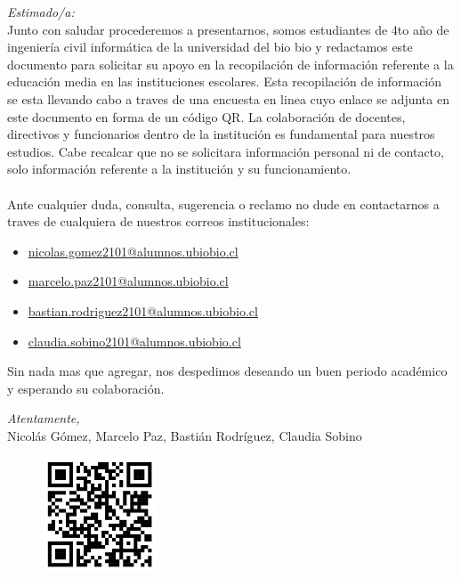 \documentclass{templateNote}
\newcommand{\email}[1]{\href{mailto:#1}{#1}}
\begin{document}


\portada
\margenes 

\noindent\textit{Estimado/a:}\\

Junto con saludar procederemos a presentarnos, somos estudiantes de 4to año de ingeniería civil informática de la universidad del bio bio y redactamos este documento para solicitar su apoyo en la recopilación de información referente a la educación media en las instituciones escolares. Esta recopilación de información se esta llevando  cabo a traves de una encuesta en linea cuyo enlace se adjunta en este documento en forma de un código QR. La colaboración de docentes, directivos y funcionarios dentro de la institución es fundamental para nuestros estudios. Cabe recalcar que no se solicitara información personal ni de contacto, solo información referente a la institución y su funcionamiento.  
\\\\
Ante cualquier duda, consulta, sugerencia o reclamo no dude en contactarnos a traves de cualquiera de nuestros correos institucionales:
\begin{itemize}
    \item \email{nicolas.gomez2101@alumnos.ubiobio.cl}
    \item \email{marcelo.paz2101@alumnos.ubiobio.cl}
    \item \email{bastian.rodriguez2101@alumnos.ubiobio.cl}
    \item \email{claudia.sobino2101@alumnos.ubiobio.cl}
\end{itemize}

\noindent Sin nada mas que agregar, nos despedimos deseando un buen periodo académico y esperando su colaboración.

\vspace*{0.8cm}
\begin{center}
    \textit{Atentamente,}\\
        Nicolás Gómez, Marcelo Paz, Bastián Rodríguez, Claudia Sobino
\end{center}

\vspace*{1cm}
\begin{figure}[H]
    \centering
    \includegraphics[width=0.3\textwidth]{img/qr.jpg}
\end{figure}
\end{document}
